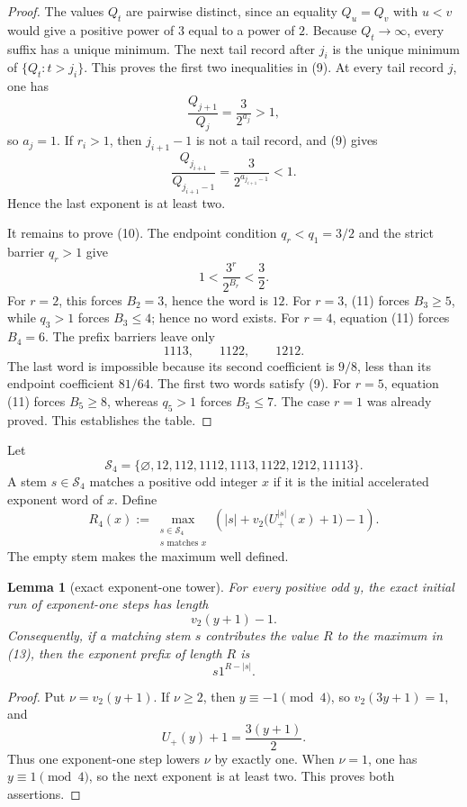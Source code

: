 \documentclass[11pt]{article}
\newtheorem{lemma}[theorem]{Lemma}
\newcommand{\Up}{U_+}
\begin{document}
\begin{proof}
The values $Q_t$ are pairwise distinct, since an equality $Q_u=Q_v$ with
$u<v$ would give a positive power of $3$ equal to a power of $2$.
Because $Q_t\to\infty$, every suffix has a unique minimum.  The next tail
record after $j_i$ is the unique minimum of $\{Q_t:t>j_i\}$.  This proves
the first two inequalities in (9).  At every tail record $j$, one has
\[
  \frac{Q_{j+1}}{Q_j}=\frac3{2^{a_j}}>1,
\]
so $a_j=1$.  If $r_i>1$, then $j_{i+1}-1$ is not a tail record, and (9)
gives
\[
  \frac{Q_{j_{i+1}}}{Q_{j_{i+1}-1}}
  =\frac3{2^{a_{j_{i+1}-1}}}<1.
\]
Hence the last exponent is at least two.

It remains to prove (10).  The endpoint condition $q_r<q_1=3/2$ and the
strict barrier $q_r>1$ give
\[
  1<\frac{3^r}{2^{B_r}}<\frac32.
  \tag{11}
\]
For $r=2$, this forces $B_2=3$, hence the word is $12$.  For $r=3$,
(11) forces $B_3\geq5$, while $q_3>1$ forces $B_3\leq4$; hence no word
exists.  For $r=4$, equation (11) forces $B_4=6$.  The prefix barriers
leave only
\[
  1113,\qquad1122,\qquad1212.
\]
The last word is impossible because its second coefficient is $9/8$, less
than its endpoint coefficient $81/64$.  The first two words satisfy (9).
For $r=5$, equation (11) forces $B_5\geq8$, whereas $q_5>1$ forces
$B_5\leq7$.  The case $r=1$ was already proved.  This establishes the
table.
\end{proof}

Let
\[
  \mathcal S_4=
  \{\varnothing,12,112,1112,1113,1122,1212,11113\}.
  \tag{12}
\]
A stem $s\in\mathcal S_4$ matches a positive odd integer $x$ if it is the
initial accelerated exponent word of $x$.  Define
\[
  R_4(x):=
  \max_{\substack{s\in\mathcal S_4\\s\text{ matches }x}}
  \left(
    |s|+v_2\bigl(\Up^{|s|}(x)+1\bigr)-1
  \right).
  \tag{13}
\]
The empty stem makes the maximum well defined.

\begin{lemma}[exact exponent-one tower]
For every positive odd $y$, the exact initial run of exponent-one steps
has length
\[
  v_2(y+1)-1.
  \tag{14}
\]
Consequently, if a matching stem $s$ contributes the value $R$ to the
maximum in (13), then the exponent prefix of length $R$ is
\[
  s1^{R-|s|}.
  \tag{15}
\]
\end{lemma}

\begin{proof}
Put $\nu=v_2(y+1)$.  If $\nu\geq2$, then $y\equiv-1\pmod4$, so
$v_2(3y+1)=1$, and
\[
  \Up(y)+1=\frac{3(y+1)}2.
  \tag{16}
\]
Thus one exponent-one step lowers $\nu$ by exactly one.  When $\nu=1$,
one has $y\equiv1\pmod4$, so the next exponent is at least two.  This
proves both assertions.
\end{proof}
\end{document}
